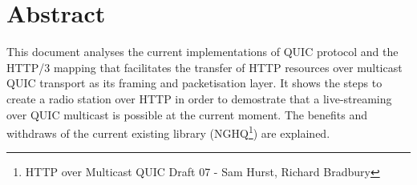 \section*{Abstract}

{
    This document analyses the current implementations of QUIC protocol and the HTTP/3 mapping that facilitates the transfer
    of HTTP resources over multicast QUIC transport as its framing and packetisation layer. It shows the steps to create a radio station over HTTP in order to demostrate
    that a live-streaming over QUIC multicast is possible at the current moment. The benefits and withdraws of the current
    existing library (NGHQ\footnote{HTTP over Multicast QUIC Draft 07 - Sam Hurst, Richard Bradbury}) are explained.
}
